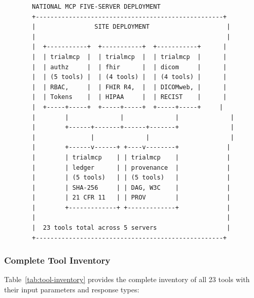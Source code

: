\documentclass{article}
\begin{document}
\begin{figure}[H]
\begin{verbatim}
  NATIONAL MCP FIVE-SERVER DEPLOYMENT
  +---------------------------------------------------+
  |                SITE DEPLOYMENT                     |
  |                                                    |
  |  +-----------+  +-----------+  +-----------+      |
  |  | trialmcp  |  | trialmcp  |  | trialmcp  |      |
  |  | authz     |  | fhir      |  | dicom     |      |
  |  | (5 tools) |  | (4 tools) |  | (4 tools) |      |
  |  | RBAC,     |  | FHIR R4,  |  | DICOMweb, |      |
  |  | Tokens    |  | HIPAA     |  | RECIST    |      |
  |  +-----+-----+  +-----+-----+  +-----+-----+     |
  |        |              |              |              |
  |        +------+-------+------+-------+              |
  |               |              |                      |
  |        +------v------+ +----v--------+             |
  |        | trialmcp    | | trialmcp    |             |
  |        | ledger      | | provenance  |             |
  |        | (5 tools)   | | (5 tools)   |             |
  |        | SHA-256     | | DAG, W3C    |             |
  |        | 21 CFR 11   | | PROV        |             |
  |        +-------------+ +-------------+             |
  |                                                    |
  |  23 tools total across 5 servers                   |
  +---------------------------------------------------+
\end{verbatim}
\end{figure}

\subsubsection{Complete Tool Inventory}

Table~\ref{tab:tool-inventory} provides the complete inventory of all 23 tools with their input parameters and response types:
\end{document}
